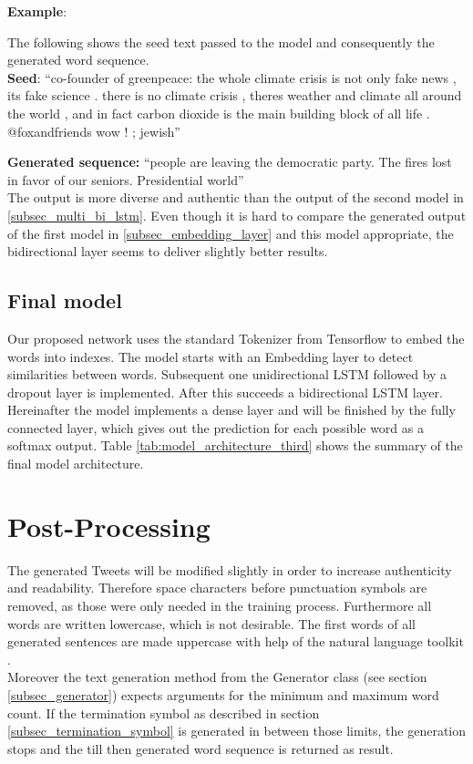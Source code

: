 \documentclass[conference]{IEEEtran}
\begin{document}
\textbf{Example}:

The following shows the seed text passed to the model and consequently the generated word sequence.\\

\textbf{Seed}: ``co-founder of greenpeace: the whole climate crisis is not only fake news , its fake science . there is no climate crisis , theres weather and climate all around the world , and in fact carbon dioxide is the main building block of all life . @foxandfriends wow ! ; jewish''

\textbf{Generated sequence:} ``people are leaving the democratic party. The fires lost in favor of our seniors. Presidential world''\\

The output is more diverse and authentic than the output of the second model in \ref{subsec_multi_bi_lstm}. Even though it is hard to compare the generated output of the first model in \ref{subsec_embedding_layer} and this model appropriate, the bidirectional layer seems to deliver slightly better results.

\subsection{Final model}

Our proposed network uses the standard Tokenizer from Tensorflow to embed the words into indexes. The model starts with an Embedding layer to detect similarities between words. Subsequent one unidirectional LSTM followed by a dropout layer is implemented. After this succeeds a bidirectional LSTM layer. Hereinafter the model implements a dense layer and will be finished by the fully connected layer, which gives out the prediction for each possible word as a softmax output. Table \ref{tab:model_architecture_third} shows the summary of the final model architecture.

\section{Post-Processing}

The generated Tweets will be modified slightly in order to increase authenticity and readability. Therefore space characters before punctuation symbols are removed, as those were only needed in the training process. Furthermore all words are written lowercase, which is not desirable. The first words of all generated sentences are made uppercase with help of the natural language toolkit \cite{nltk}.\\
Moreover the text generation method from the Generator class (see section \ref{subsec_generator}) expects arguments for the minimum and maximum word count. If the termination symbol as described in section \ref{subsec_termination_symbol} is generated in between those limits, the generation stops and the till then generated word sequence is returned as result.
\end{document}
